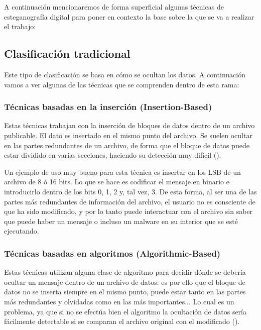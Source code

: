 A continuación mencionaremos de forma superficial algunas técnicas de esteganografía digital para poner en contexto la base sobre la que se va a realizar el trabajo:

\subsection{Clasificación tradicional}
\label{sec:trad}

Este tipo de clasificación se basa en cómo se ocultan los datos. A continuación vamos a ver algunas de las técnicas que se comprenden dentro de esta rama:

\subsubsection{Técnicas basadas en la inserción (Insertion-Based)}

Estas técnicas trabajan con la inserción de bloques de datos dentro de un archivo publicable. El dato es insertado en el mismo punto del archivo. Se suelen ocultar en las partes redundantes de un archivo, de forma que el bloque de datos puede estar dividido en varias secciones, haciendo su detección muy difícil (\cite{esteganografia-digital}).%

Un ejemplo de uso muy bueno para esta técnica es insertar en los \ac{LSB} de un archivo de 8 ó 16 bits. Lo que se hace es codificar el mensaje en binario e introducirlo dentro de los bits 0, 1, 2 y, tal vez, 3. De esta forma, al ser una de las partes más redundantes de información del archivo, el usuario no es consciente de que ha sido modificado, y por lo tanto puede interactuar con el archivo sin saber que puede haber un mensaje o incluso un malware en su interior que se esté ejecutando.

\subsubsection{Técnicas basadas en algoritmos (Algorithmic-Based)} 

Estas técnicas utilizan alguna clase de algoritmo para decidir dónde se debería ocultar un mensaje dentro de un archivo de datos: es por ello que el bloque de datos no se inserta siempre en el mismo punto, puede estar tanto en las partes más redundantes y olvidadas como en las más importantes... Lo cual es un problema, ya que si no se efectúa bien el algoritmo la ocultación de datos sería fácilmente detectable si se comparan el archivo original con el modificado (\cite{esteganografia-digital}). %

